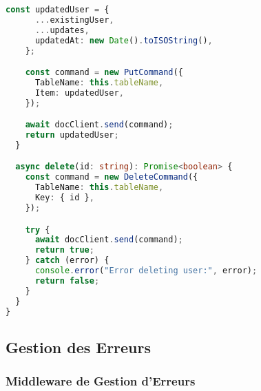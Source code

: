 \begin{lstlisting}[language=TypeScript, caption=User Repository Implementation]
    const updatedUser = {
      ...existingUser,
      ...updates,
      updatedAt: new Date().toISOString(),
    };

    const command = new PutCommand({
      TableName: this.tableName,
      Item: updatedUser,
    });

    await docClient.send(command);
    return updatedUser;
  }

  async delete(id: string): Promise<boolean> {
    const command = new DeleteCommand({
      TableName: this.tableName,
      Key: { id },
    });

    try {
      await docClient.send(command);
      return true;
    } catch (error) {
      console.error("Error deleting user:", error);
      return false;
    }
  }
}
\end{lstlisting}

\subsection{Gestion des Erreurs}

\subsubsection{Middleware de Gestion d'Erreurs}

